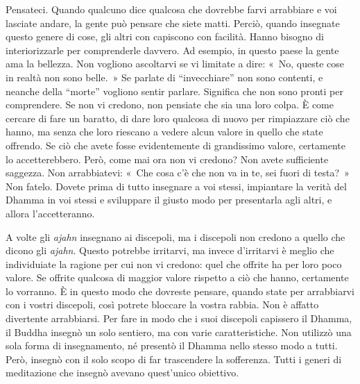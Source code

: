 Pensateci. Quando qualcuno dice qualcosa che dovrebbe farvi arrabbiare e
voi lasciate andare, la gente può pensare che siete matti. Perciò,
quando insegnate questo genere di cose, gli altri con capiscono con
facilità. Hanno bisogno di interiorizzarle per comprenderle davvero. Ad
esempio, in questo paese la gente ama la bellezza. Non vogliono
ascoltarvi se vi limitate a dire: «~No, queste cose in realtà non sono
belle.~» Se parlate di ``invecchiare'' non sono contenti, e neanche
della ``morte'' vogliono sentir parlare. Significa che non sono pronti
per comprendere. Se non vi credono, non pensiate che sia una loro colpa.
È come cercare di fare un baratto, di dare loro qualcosa di nuovo per
rimpiazzare ciò che hanno, ma senza che loro riescano a vedere alcun
valore in quello che state offrendo. Se ciò che avete fosse
evidentemente di grandissimo valore, certamente lo accetterebbero. Però,
come mai ora non vi credono? Non avete sufficiente saggezza. Non
arrabbiatevi: «~Che cosa c'è che non va in te, sei fuori di testa?~» Non
fatelo. Dovete prima di tutto insegnare a voi stessi, impiantare la
verità del Dhamma in voi stessi e sviluppare il giusto modo per
presentarla agli altri, e allora l'accetteranno.

A volte gli \emph{ajahn} insegnano ai discepoli, ma i discepoli non
credono a quello che dicono gli \emph{ajahn}. Questo potrebbe irritarvi,
ma invece d'irritarvi è meglio che individuiate la ragione per cui non
vi credono: quel che offrite ha per loro poco valore. Se offrite
qualcosa di maggior valore rispetto a ciò che hanno, certamente lo
vorranno. È in questo modo che dovreste pensare, quando state per
arrabbiarvi con i vostri discepoli, così potrete bloccare la vostra
rabbia. Non è affatto divertente arrabbiarsi. Per fare in modo che i
suoi discepoli capissero il Dhamma, il Buddha insegnò un solo sentiero,
ma con varie caratteristiche. Non utilizzò una sola forma di
insegnamento, né presentò il Dhamma nello stesso modo a tutti. Però,
insegnò con il solo scopo di far trascendere la sofferenza. Tutti i
generi di meditazione che insegnò avevano quest'unico obiettivo.

